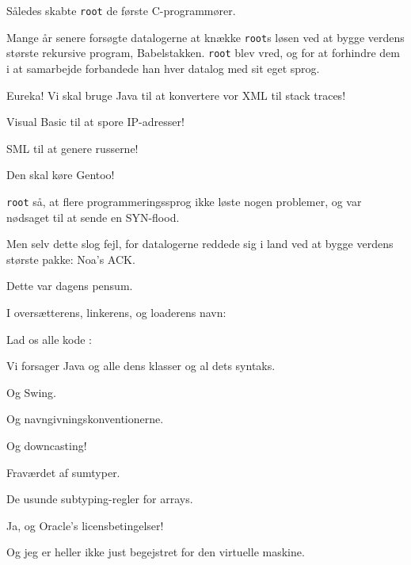 \documentclass[a4paper,11pt]{article}
\begin{document}
\begin{sketch}
   Således skabte \texttt{root} de første C-programmører.


   Mange år senere forsøgte datalogerne at knække
  \texttt{root}s løsen ved at bygge verdens største rekursive program,
  Babelstakken.  \texttt{root} blev vred, og for at forhindre dem i at
  samarbejde forbandede han hver datalog med sit eget sprog.

   Eureka!  Vi skal bruge Java til at konvertere vor XML til stack traces!

   Visual Basic til at spore IP-adresser!

   SML til at genere russerne!

   Den skal køre Gentoo!


   \texttt{root} så, at flere programmeringssprog ikke løste
  nogen problemer, og var nødsaget til at sende en SYN-flood.


   Men selv dette slog fejl, for datalogerne reddede sig i
  land ved at bygge verdens største pakke: Noa's ACK.


   Dette var dagens pensum.


   I oversætterens, linkerens, og loaderens navn:

   Lad os alle kode :

   Vi forsager Java og alle dens klasser og al dets syntaks.

   Og Swing.

   Og navngivningskonventionerne.

   Og downcasting!

   Fraværdet af sumtyper.

   De usunde subtyping-regler for arrays.

   Ja, og Oracle's licensbetingelser!

   Og jeg er heller ikke just begejstret for den virtuelle
  maskine.


\end{sketch}
\end{document}
